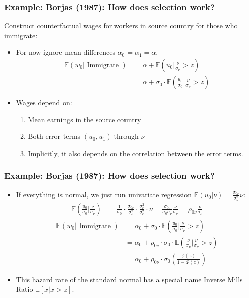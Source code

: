 \documentclass[aspectratio=169,11pt]{beamer}
\begin{document}
\begin{frame}
\frametitle{Example: Borjas (1987): How does selection work?}
Construct \alert{counterfactual wages} for workers in \alert{source} country for those who immigrate:
\begin{itemize}
\item For now ignore mean differences $\alpha_0 = \alpha_1 = \alpha$.
\begin{align*}
\mathbb{E} \left(w_{0} | \text { Immigrate }\right) &=\alpha+\mathbb{E}\left(u_{0} | \frac{\nu}{\sigma_{\nu}}>z\right) \\
&=\alpha+\sigma_{0} \cdot \mathbb{E}\left(\frac{u_{0}}{\sigma_{0}} | \frac{\nu}{\sigma_{\nu}}>z\right)
\end{align*}
\item Wages depend on:
\begin{enumerate}
\item Mean earnings in the source country
\item Both error terms $\left(u_{0}, u_{1}\right)$ through $\nu$
\item Implicitly, it also depends on the correlation between the error terms.
\end{enumerate}
\end{itemize}
\end{frame}


\begin{frame}
\frametitle{Example: Borjas (1987): How does selection work?}
\begin{itemize}
\item If everything is normal, we just run univariate regression $\mathbb{E}\left(u_{0} | \nu\right)=\frac{\sigma_{0 \nu}}{\sigma_{\nu}^{2}} \nu$:
\begin{align*}
\mathbb{E}\left(\frac{u_{0}}{\sigma_{0}} | \frac{\nu}{\sigma_{\nu}}\right) &= \frac{1}{\sigma_{0}}\cdot \frac{\sigma_{0 \nu}}{\sigma_{\nu}^{2}} \cdot \frac{\sigma_{\nu}^{2}}{\sigma_{\nu}^{2}} \cdot \nu  
=\frac{\sigma_{0 \nu}}{\sigma_{0} \sigma_{\nu}} \frac{\nu}{\sigma_{\nu}}  =\rho_{0 \nu} \frac{\nu}{\sigma_{\nu}} 
\end{align*}
\begin{align*}
\mathbb{E}\left(w_{0} | \text { Immigrate }\right) 
&=\alpha_{0}+\sigma_{0} \cdot \mathbb{E}\left(\frac{u_{0}}{\sigma_{0}} | \frac{\nu}{\sigma_{\nu}}>z\right) \\
 &=\alpha_{0}+\rho_{0 \nu} \cdot \sigma_{0} \cdot \mathbb{E}\left(\frac{\nu}{\sigma_{\nu}} | \frac{\nu}{\sigma_{\nu}}>z\right) \\
  &=\alpha_{0}+\rho_{0 \nu} \cdot \sigma_{0}\left(\frac{\phi(z)}{1-\Phi(z)}\right) 
\end{align*}
\item This hazard rate of the standard normal has a special name \alert{Inverse Mills Ratio} $\mathbb{E}[x | x > z]$.
\end{itemize}
\end{frame}
\end{document}
